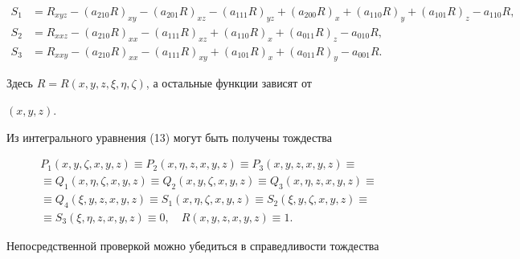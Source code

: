 \begin{align*}


S_{1}&=R_{xyz}-(a_{210}R)_{xy}-(a_{201}R)_{xz}-(a_{111}R)_{yz}+


(a_{200}R)_{x}+(a_{110}R)_{y}+(a_{101}R)_{z}-a_{110}R, \\


%


S_{2}&=R_{xxz}-(a_{210}R)_{xx}-(a_{111}R)_{xz}+(a_{110}R)_{x}+


(a_{011}R)_{z}-a_{010}R, \\


%


S_{3}&=R_{xxy}-(a_{210}R)_{xx}-(a_{111}R)_{xy}+(a_{101}R)_{x}+


(a_{011}R)_{y}-a_{001}R. 


\end{align*}


Здесь $R=R(x,y,z,\xi,\eta,\zeta)$, а остальные функции зависят от


$(x,y,z)$.





Из интегрального уравнения (13) могут быть получены тождества


\begin{equation} %


\begin{array}{c}


P_{1}(x,y,\zeta,x,y,z)\equiv P_{2}(x,\eta,z,x,y,z)\equiv


P_{3}(x,y,z,x,y,z)\equiv \\[2mm]


\equiv Q_{1}(x,\eta,\zeta,x,y,z)\equiv Q_{2}(x,y,\zeta,x,y,z)\equiv


Q_{3}(x,\eta,z,x,y,z)\equiv \\[2mm]


\equiv Q_{4}(\xi,y,z,x,y,z)\equiv S_{1}(x,\eta,\zeta,x,y,z)\equiv


S_{2}(\xi,y,\zeta,x,y,z)\equiv \\[2mm]


\equiv S_{3}(\xi,\eta,z,x,y,z)\equiv 0, \quad


R(x,y,z,x,y,z)\equiv 1.


\end{array}


\end{equation}





Непосредственной проверкой можно убедиться в справедливости тождества


